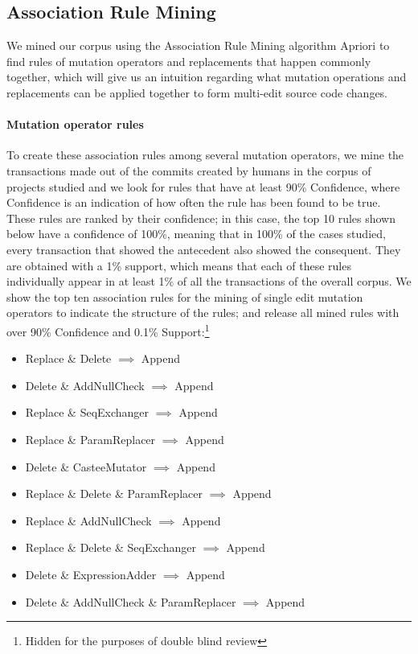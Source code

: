 \documentclass[conference]{IEEEtran}
\begin{document}
\subsection{Association Rule Mining} \label{armRes}

We mined our corpus using the Association Rule Mining algorithm Apriori 
to find rules of mutation operators and 
replacements that happen commonly together, which will give us an intuition regarding
what mutation operations and replacements can be applied together to form multi-edit
source code changes.

\paragraph{Mutation operator rules}
To create these association rules among several mutation operators, we mine the
transactions made out of the commits created by humans in the corpus of projects
studied and we look for rules that have at least 90\% Confidence, where
Confidence is an indication of how often the rule has been found to be true.  
These rules are ranked by their confidence; in this case, the top 10 rules shown
below have a confidence of 100\%, meaning that in 100\% of the cases
studied, every transaction that showed the antecedent also showed the consequent.
They are obtained with a 1\% support, which means that each of these rules
individually appear in at least 1\% of all the transactions of the overall
corpus. We show the top ten association rules for the mining of single edit 
mutation operators to indicate the structure of the rules; and release all mined
rules with over 90\% Confidence and 0.1\% Support:\footnote{Hidden for the purposes of double blind review} %


\begin{itemize}
\item Replace \& Delete $\implies$ Append
\item Delete \& AddNullCheck $\implies$ Append
\item Replace \& SeqExchanger $\implies$ Append
\item Replace \& ParamReplacer $\implies$ Append
\item Delete \& CasteeMutator $\implies$ Append
\item Replace \& Delete \& ParamReplacer $\implies$ Append
\item Replace \& AddNullCheck $\implies$ Append
\item Replace \& Delete \& SeqExchanger $\implies$ Append
\item Delete \& ExpressionAdder $\implies$ Append
\item Delete \& AddNullCheck \& ParamReplacer $\implies$ Append
\end{itemize}
\end{document}
